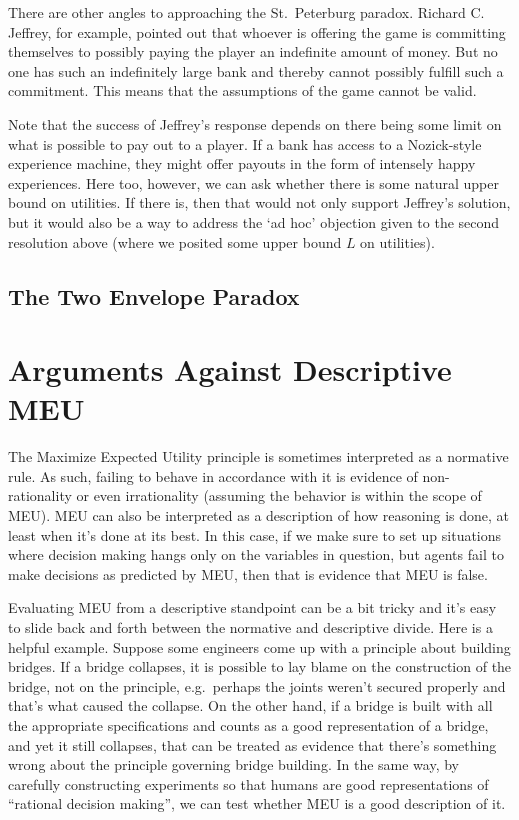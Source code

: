 \documentclass[]{tufte-book}
\begin{document}
There are other angles to approaching the St.~Peterburg paradox. Richard C. Jeffrey, for example, pointed out that whoever is offering the game is committing themselves to possibly paying the player an indefinite amount of money. But no one has such an indefinitely large bank and thereby cannot possibly fulfill such a commitment. This means that the assumptions of the game cannot be valid.

Note that the success of Jeffrey's response depends on there being some limit on what is possible to pay out to a player. If a bank has access to a Nozick-style experience machine, they might offer payouts in the form of intensely happy experiences. Here too, however, we can ask whether there is some natural upper bound on utilities. If there is, then that would not only support Jeffrey's solution, but it would also be a way to address the `ad hoc' objection given to the second resolution above (where we posited some upper bound \(L\) on utilities).

\hypertarget{the-two-envelope-paradox}{%
\subsection{The Two Envelope Paradox}\label{the-two-envelope-paradox}}

\hypertarget{arguments-against-descriptive-meu}{%
\section{Arguments Against Descriptive MEU}\label{arguments-against-descriptive-meu}}

The Maximize Expected Utility principle is sometimes interpreted as a normative rule. As such, failing to behave in accordance with it is evidence of non-rationality or even irrationality (assuming the behavior is within the scope of MEU). MEU can also be interpreted as a description of how reasoning is done, at least when it's done at its best. In this case, if we make sure to set up situations where decision making hangs only on the variables in question, but agents fail to make decisions as predicted by MEU, then that is evidence that MEU is false.

Evaluating MEU from a descriptive standpoint can be a bit tricky and it's easy to slide back and forth between the normative and descriptive divide. Here is a helpful example. Suppose some engineers come up with a principle about building bridges. If a bridge collapses, it is possible to lay blame on the construction of the bridge, not on the principle, e.g.~perhaps the joints weren't secured properly and that's what caused the collapse. On the other hand, if a bridge is built with all the appropriate specifications and counts as a good representation of a bridge, and yet it still collapses, that can be treated as evidence that there's something wrong about the principle governing bridge building. In the same way, by carefully constructing experiments so that humans are good representations of ``rational decision making'', we can test whether MEU is a good description of it.
\end{document}
